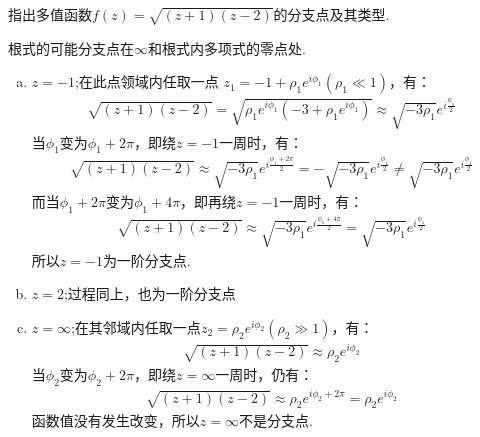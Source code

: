\documentclass[lang=cn, titlestyle=display, scheme=chinese]{elegantbook}
\begin{document}
                \begin{example}
                    \label{ex:riemann_surface}
                    指出多值函数$f(z) = \sqrt{(z + 1)(z - 2)}$的分支点及其类型.
                \end{example}
                \begin{solution}
                    根式的可能分支点在$\infty$和根式内多项式的零点处.
                    \begin{enumerate}[(a)]
                        \item $z = -1$;在此点领域内任取一点 $z_1 = -1 + \rho_1 e^{i \phi_1}(\rho_1 \ll 1)$，有：
                            \begin{align*}
                                \sqrt{(z + 1)(z - 2)} = \sqrt{\rho_1 e^{i \phi_1}(-3 + \rho_1 e^{i \phi_1})} 
                                \approx \sqrt{-3 \rho_1}e^{i\frac{\phi_1}{2}}
                            \end{align*}
                            当$\phi_1$变为$\phi_1 + 2\pi$，即绕$z = -1$一周时，有：
                            \begin{align*}
                                \sqrt{(z + 1)(z - 2)} \approx \sqrt{-3 \rho_1}e^{i\frac{\phi_1 + 2\pi}{2}}
                                = -\sqrt{-3 \rho_1}e^{i\frac{\phi_1}{2}}
                                \neq \sqrt{-3 \rho_1}e^{i\frac{\phi_1}{2}}
                            \end{align*}
                            而当$\phi_1 + 2\pi$变为$\phi_1 + 4\pi$，即再绕$z = -1$一周时，有：
                            \begin{align*}
                                \sqrt{(z + 1)(z - 2)} \approx \sqrt{-3 \rho_1}e^{i\frac{\phi_1 + 4\pi}{2}}
                                = \sqrt{-3 \rho_1}e^{i\frac{\phi_1}{2}}
                            \end{align*}
                            所以$z = -1$为一阶分支点.
                        \item $z = 2$;过程同上，也为一阶分支点
                        \item $z = \infty$;在其邻域内任取一点$z_2 = \rho_2 e^{i \phi_2}(\rho_2 \gg 1)$，有：
                            \begin{align*}
                                \sqrt{(z + 1)(z - 2)} \approx \rho_2 e^{i\phi_2}
                            \end{align*}
                            当$\phi_2$变为$\phi_2 + 2\pi$，即绕$z = \infty$一周时，仍有：
                            \begin{align*}
                                \sqrt{(z + 1)(z - 2)} \approx \rho_2 e^{i\phi_2 + 2\pi}
                                = \rho_2 e^{i\phi_2}
                            \end{align*}
                            函数值没有发生改变，所以$z = \infty$不是分支点.
                    \end{enumerate}
                \end{solution}
\end{document}
